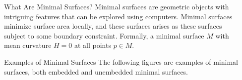 \documentclass[final]{beamer}
\newlength{\sepwidth}
\newlength{\colwidth}
\newcommand{\separatorcolumn}{\begin{column}{\sepwidth}\end{column}}
\begin{document}
\begin{frame}[t]
\begin{columns}[t]
\separatorcolumn

\begin{column}{\colwidth}

  \begin{alertblock}{What Are Minimal Surfaces?}
      Minimal surfaces are geometric objects with intriguing features that can be explored using computers. Minimal surfaces minimize surface area locally, and these surfaces arises as these surfaces subject to some boundary constraint. Formally, a minimal surface $M$ with mean curvature $H=0$ at all points $p \in M$. 
  \end{alertblock}
\vspace{\baselineskip}
  \begin{block}{Examples of Minimal Surfaces}
   The following figures are examples of minimal surfaces, both embedded and unembedded minimal surfaces.
   \vspace{\baselineskip}
   \begin{figure}
       \centering

\end{figure}
\end{block}
\end{column}
\end{columns}
\end{frame}
\end{document}
